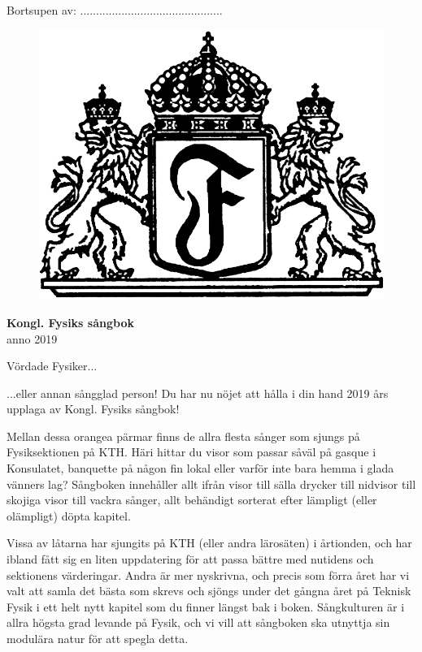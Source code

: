 \documentclass[a6paper,12pt]{article}
\begin{document}
\noindent Bortsupen av: .............................................
\vspace{50pt}
\begin{figure}[!h]
\centering
\includegraphics[width=\textwidth]{sangbok.png}
\end{figure}
\vspace{-20pt}
\begin{center}
\Huge\textbf{Kongl. Fysiks sångbok} \\
\Large anno 2019
\end{center}

\newpage
\setlength{\oddsidemargin}{-0.57in}
\noindent
\Large Vördade Fysiker... 

\footnotesize \noindent ...eller annan sångglad person! Du har nu nöjet att hålla i din hand 2019 års upplaga av Kongl. Fysiks sångbok!

Mellan dessa orangea pärmar finns de allra flesta sånger som sjungs på Fysiksektionen på KTH. Häri hittar du visor som passar såväl på gasque i Konsulatet, banquette på någon fin lokal eller varför inte bara hemma i glada vänners lag? Sångboken innehåller allt ifrån visor till sälla drycker till nidvisor till skojiga visor till vackra sånger, allt behändigt sorterat efter lämpligt (eller olämpligt) döpta kapitel. 

Vissa av låtarna har sjungits på KTH (eller andra lärosäten) i årtionden, och har ibland fått sig en liten uppdatering för att passa bättre med nutidens och sektionens värderingar. Andra är mer nyskrivna, och precis som förra året har vi valt att samla det bästa som skrevs och sjöngs under det gångna året på Teknisk Fysik i ett helt nytt kapitel som du finner längst bak i boken. Sångkulturen är i allra högsta grad levande på Fysik, och vi vill att sångboken ska utnyttja sin modulära natur för att spegla detta. 
\end{document}
